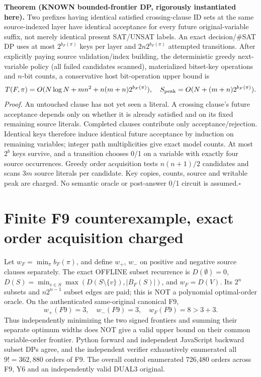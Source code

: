\documentclass[11pt]{article}
\begin{document}
\noindent\textbf{Theorem (KNOWN bounded-frontier DP, rigorously instantiated here).}
Two prefixes having identical satisfied crossing-clause ID sets at the same source-indexed layer have identical acceptance for every future original-variable suffix, not merely identical present SAT/UNSAT labels. An exact decision/#SAT DP uses at most \(2^{b_F(\pi)}\) keys per layer and \(2n2^{b_F(\pi)}\) attempted transitions. After explicitly paying source validation/index building, the deterministic greedy next-variable policy (all failed candidates scanned), materialized bitset-key operations and \(n\)-bit counts, a conservative host bit-operation upper bound is
\[
T(F,\pi)=O(N\log N+mn^2+n(m+n)2^{b_F(\pi)}),\quad
S_{\rm peak}=O(N+(m+n)2^{b_F(\pi)}).
\]
\noindent\textit{Proof.} An untouched clause has not yet seen a literal. A crossing clause's future acceptance depends only on whether it is already satisfied and on its fixed remaining source literals. Completed clauses contribute only acceptance/rejection. Identical keys therefore induce identical future acceptance by induction on remaining variables; integer path multiplicities give exact model counts. At most \(2^b\) keys survive, and a transition chooses 0/1 on a variable with exactly four source occurrences. Greedy order acquisition tests \(n(n+1)/2\) candidates and scans \(3m\) source literals per candidate. Key copies, counts, source and writable peak are charged. No semantic oracle or post-answer 0/1 circuit is assumed.\hfill\(\square\)

\section*{Finite F9 counterexample, exact order acquisition charged}
Let \(w_F=\min_\pi b_F(\pi)\), and define \(w_+\), \(w_-\) on positive and negative source clauses separately. The exact OFFLINE subset recurrence is \(D(\emptyset)=0\), \(D(S)=\min_{v\in S}\max(D(S\setminus\{v\}),|B_F(S)|)\), and \(w_F=D(V)\). Its \(2^n\) subsets and \(n2^{n-1}\) subset edges are paid; this is NOT a polynomial optimal-order oracle. On the authenticated same-original canonical F9,
\[
\boxed{w_+(F9)=3,\quad w_-(F9)=3,\quad w_F(F9)=8>3+3.}
\]
Thus independently minimizing the two signed frontiers and summing their separate optimum widths does NOT give a valid upper bound on their common variable-order frontier. Python forward and independent JavaScript backward subset DPs agree, and the independent verifier exhaustively enumerated all \(9!=362{,}880\) orders of F9. The overall control enumerated 726,480 orders across F9, Y6 and an independently valid DUAL3 original.
\end{document}
